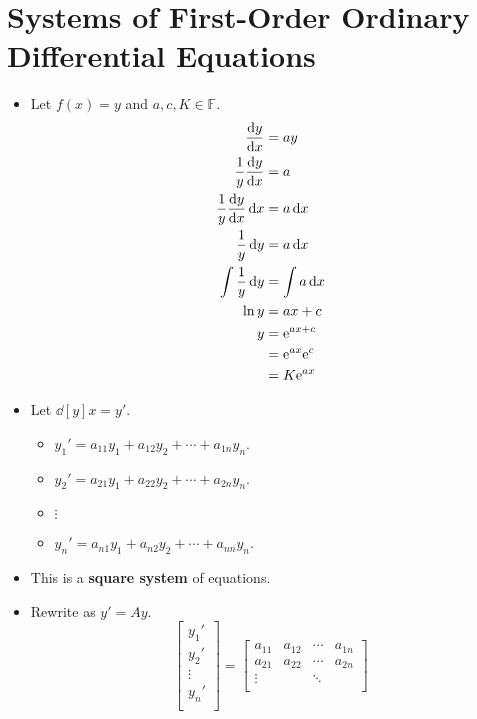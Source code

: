 \documentclass{article}
\begin{document}
\section*{Systems of First-Order Ordinary Differential Equations}
\begin{itemize}
    \item {}Let $f(x)=y$ and $a,c,K\in\mathbb{F}$.
    \begin{align*}
        \dd[y]{x} &= ay\\
        \frac{1}{y}\dd[y]{x} &= a\\
        \frac{1}{y}\dd[y]{x}\, \dx &= a\, \dx\\
        \frac{1}{y}\, \dy &= a\, \dx\\
        \int \frac{1}{y}\, \dy &= \int a\, \dx\\
        \ln y &= ax+c\\
        y &= \e^{ax+c}\\
        &= \e^{ax}\text{e}^c\\
        &= K\e^{ax}
    \end{align*}
    \item Let $\dd[y]{x}=y'$.
    \begin{itemize}
        \item $y_1' = a_{11}y_1+a_{12}y_2+\cdots+a_{1n}y_n$.
        \item $y_2' = a_{21}y_1+a_{22}y_2+\cdots+a_{2n}y_n$.
        \item $\vdots$
        \item $y_n' = a_{n1}y_1+a_{n2}y_2+\cdots+a_{nn}y_n$.
    \end{itemize}
    \item This is a \textbf{square system} of equations.
    \item Rewrite as $y' = Ay$.
    \begin{equation*}
        \begin{bmatrix}
            y_1'\\
            y_2'\\
            \vdots\\
            y_n'\\
        \end{bmatrix}
        =
        \begin{bmatrix}
            a_{11} & a_{12} & \cdots & a_{1n}\\
            a_{21} & a_{22} & \cdots & a_{2n}\\
            \vdots &        & \ddots &       \\

\end{bmatrix}
\end{equation*}
\end{itemize}
\end{document}

